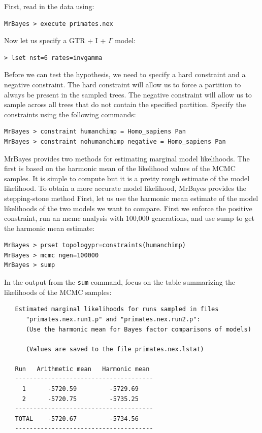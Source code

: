 \documentclass[12pt]{book}
\newcommand{\ttt}[1]{\texttt{#1} }
\begin{document}
First, read in the data using:

\begin{verbatim}
MrBayes > execute primates.nex
\end{verbatim}

Now let us specify a GTR + I + $\Gamma$ model:

\begin{verbatim}
> lset nst=6 rates=invgamma
\end{verbatim}

Before we can test the hypothesis, we need to specify a hard constraint and a negative constraint.
The hard constraint will allow us to force a partition to always be present in the sampled trees.
The negative constraint will allow us to sample across all trees that do not contain the specified
partition. Specify the constraints using the following commands:

\begin{verbatim}
MrBayes > constraint humanchimp = Homo_sapiens Pan
MrBayes > constraint nohumanchimp negative = Homo_sapiens Pan
\end{verbatim}

MrBayes provides two methods for estimating marginal model likelihoods. The first is based on the
harmonic mean of the likelihood values of the MCMC samples. It is simple to compute but it is a
pretty rough estimate of the model likelihood. To obtain a more accurate model likelihood, MrBayes
provides the stepping-stone method First, let us use the harmonic mean estimate of the model
likelihoods of the two models we want to compare. First we enforce the positive constraint, run an
mcmc analysis with 100,000 generations, and use sump to get the harmonic mean estimate:

\begin{singlespacing}
\begin{verbatim}
MrBayes > prset topologypr=constraints(humanchimp)
MrBayes > mcmc ngen=100000
MrBayes > sump
\end{verbatim}
\end{singlespacing}

In the output from the \ttt{sum} command, focus on the table summarizing the likelihoods of the
MCMC samples:

\begin{singlespacing}
\begin{verbatim}
   Estimated marginal likelihoods for runs sampled in files
      "primates.nex.run1.p" and "primates.nex.run2.p":
      (Use the harmonic mean for Bayes factor comparisons of models)

      (Values are saved to the file primates.nex.lstat)

   Run   Arithmetic mean   Harmonic mean
   --------------------------------------
     1      -5720.59         -5729.69
     2      -5720.75         -5735.25
   --------------------------------------
   TOTAL    -5720.67         -5734.56
   --------------------------------------
\end{verbatim}
\end{singlespacing}
\end{document}
